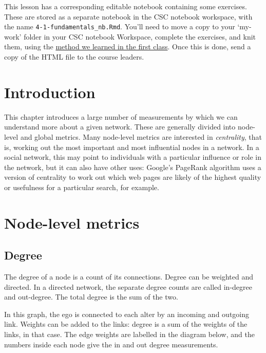\documentclass[
]{book}
\begin{document}
This lesson has a corresponding editable notebook containing some exercises. These are stored as a separate notebook in the CSC notebook workspace, with the name \texttt{4-1-fundamentals\_nb.Rmd}. You'll need to move a copy to your `my-work' folder in your CSC notebook Workspace, complete the exercises, and knit them, using the \href{https://comhis.github.io/applying-network-analysis-to-humanities/notebooks/1-1-introduction_nb.html}{method we learned in the first class}. Once this is done, send a copy of the HTML file to the course leaders.

\hypertarget{introduction-1}{%
\section{Introduction}\label{introduction-1}}

This chapter introduces a large number of measurements by which we can understand more about a given network. These are generally divided into node-level and global metrics. Many node-level metrics are interested in \emph{centrality}, that is, working out the most important and most influential nodes in a network. In a social network, this may point to individuals with a particular influence or role in the network, but it can also have other uses: Google's PageRank algorithm uses a version of centrality to work out which web pages are likely of the highest quality or usefulness for a particular search, for example.

\hypertarget{node-level-metrics}{%
\section{Node-level metrics}\label{node-level-metrics}}

\hypertarget{degree}{%
\subsection{Degree}\label{degree}}

The degree of a node is a count of its connections. Degree can be weighted and directed. In a directed network, the separate degree counts are called in-degree and out-degree. The total degree is the sum of the two.

In this graph, the ego is connected to each alter by an incoming and outgoing link. Weights can be added to the links: degree is a sum of the weights of the links, in that case. The edge weights are labelled in the diagram below, and the numbers inside each node give the in and out degree measurements.
\end{document}
